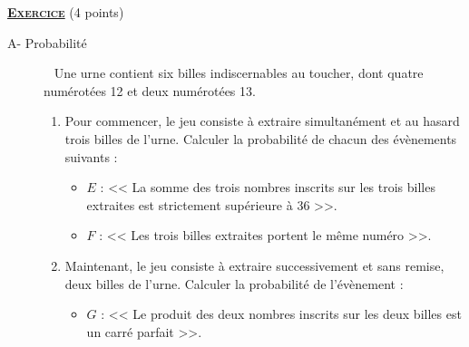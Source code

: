 \providecommand{\dx}{\mathrm{d}x}
\providecommand{\Re}[1]{\mathrm{Re}\left( #1 \right)}
\providecommand{\Im}[1]{\mathrm{Im}\left( #1 \right)}
\providecommand{\dt}{\mathrm{d}t}
\providecommand{\Ouv}{(O;\vec{u},\vec{v})}
\providecommand{\mes}[2]{\mathrm{mes}\left( \widehat{ \overrightarrow{#1} ; \overrightarrow{#2} } \right)}
\providecommand{\D}{(\mathscr{D})}
\providecommand{\Courbe}{(\mathscr{C})}
\providecommand{\Courben}{(\mathscr{C}_n)}
\providecommand{\CourbeD}{(\mathscr{C}_2)}
\providecommand{\congru}[3]{#1 \equi #2 \quad \left[ \mathrm{mod}~#3\right]}
%
\noindent \underline{\textsc{\textbf{Exercice}}} (4 points) 
      \begin{description}
            \item[A- Probabilit\'e]~\newline
                  Une urne contient six billes indiscernables au toucher, dont quatre num\'erot\'ees 12 et deux num\'erot\'ees 13.
                  \begin{enumerate}
                        \item Pour commencer, le jeu consiste \`a extraire simultan\'ement et au hasard trois billes de l'urne.
                              Calculer la probabilit\'e de chacun des \'ev\`enements suivants :
                              \begin{itemize}
                                    \item $E$ : << La somme des trois nombres inscrits sur les trois billes extraites est
                                                   strictement sup\'erieure \`a 36 >>.
                                    \item $F$ : << Les trois billes extraites portent le m\^eme num\'ero >>.
                              \end{itemize}
                        \item Maintenant, le jeu consiste \`a extraire successivement et sans remise, deux billes de l'urne.
                              Calculer la probabilit\'e de l'\'ev\`enement :
                              \begin{itemize}
                                    \item $G$ : << Le produit des deux nombres inscrits sur les deux billes est 
                                                   un carr\'e parfait >>.

\end{itemize}
\end{enumerate}
\end{description}
